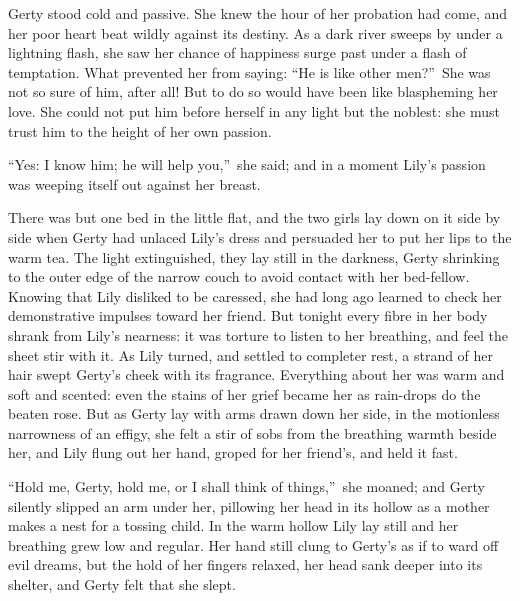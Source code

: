 \documentclass[12pt,a4paper]{book}
\begin{document}
Gerty stood cold and passive. She knew the hour of her probation
had come, and her poor heart beat wildly against its destiny. As
a dark river sweeps by under a lightning flash, she saw her
chance of happiness surge past under a flash of temptation. What
prevented her from saying: ``He is like other men?''\ She
was not so sure of him, after all! But to do so would have been
like blaspheming her love. She could not put him before herself
in any light but the noblest: she must trust him to the height of
her own passion.





``Yes: I know him; he will help you,''\ she said; and in a moment
Lily's passion was weeping itself out against her breast.





There was but one bed in the little flat, and the two girls lay
down on it side by side when Gerty had unlaced Lily's dress and
persuaded her to put her lips to the warm tea. The light
extinguished, they lay still in the darkness, Gerty shrinking to
the outer edge of the narrow couch to avoid contact with her
bed-fellow. Knowing that Lily disliked to be caressed, she had
long ago learned to check her demonstrative impulses toward her
friend. But tonight every fibre in her body shrank from Lily's
nearness: it was torture to listen to her breathing, and feel the
sheet stir with it. As Lily turned, and settled to completer
rest, a strand of her hair swept Gerty's cheek with its
fragrance. Everything about her was warm and soft and scented: 
even the stains of her grief became her as rain-drops do the
beaten rose. But as Gerty lay with arms drawn down her side, in
the motionless narrowness of an effigy, she felt a stir of sobs
from the breathing warmth beside her, and Lily flung out her
hand, groped for her friend's, and held it fast.





``Hold me, Gerty, hold me, or I shall think of things,''\ she
moaned; and Gerty silently slipped an arm under her, pillowing
her head in its hollow as a mother makes a nest for a tossing
child. In the warm hollow Lily lay still and her breathing grew
low and regular. Her hand still clung to Gerty's as if to ward off
evil dreams, but the hold of her fingers relaxed, her head sank
deeper into its shelter, and Gerty felt that she slept.
\end{document}
